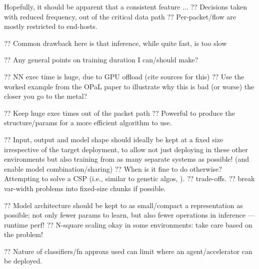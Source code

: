 Hopefully, it should be apparent that a consistent feature ...
?? Decisions taken with reduced frequency, out of the critical data path
?? Per-packet/flow are mostly restricted to end-hosts.

?? Common drawback here is that inference, while quite fast, is too slow 

?? Any general points on training duration I can/should make?

?? NN exec time is huge, due to GPU offload (cite sources for this)
?? Use the worked example from the OPaL paper to illustrate why this is bad (or worse) the closer you go to the metal?

?? Keep huge exec times out of the packet path
?? Powerful to produce the structure/params for a more efficient algorithm to use.

?? Input, output and model shape should ideally be kept at a fixed size irrespective of the target deployment, to allow not just deploying in these other environments but also training from as many separate systems as possible! (and enable model combination/sharing)
?? When is it fine to do otherwise? Attempting to solve a CSP (i.e., similar to genetic algos, ).
?? trade-offs.
?? break var-width problems into fixed-size chunks if possible.

?? Model architecture should be kept to as small/compact a representation as possible; not only fewer params to learn, but also fewer operations in inference --- runtime perf!
?? N-square scaling okay in some environments: take care based on the problem!

?? Nature of classifiers/fn approxs used can limit where an agent/accelerator can be deployed.
